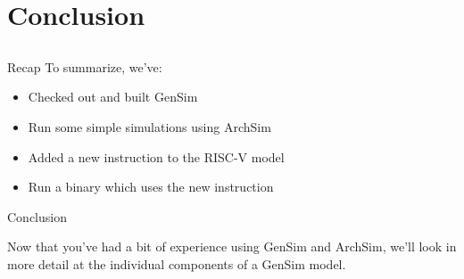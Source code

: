 \section{Conclusion}
\subsection{}

\begin{frame}{Recap}
To summarize, we've:
\begin{itemize}
\item Checked out and built GenSim
\item Run some simple simulations using ArchSim
\item Added a new instruction to the RISC-V model
\item Run a binary which uses the new instruction
\end{itemize}
\end{frame}

\begin{frame}{Conclusion}

Now that you've had a bit of experience using GenSim and ArchSim, we'll
look in more detail at the individual components of a GenSim model.

\end{frame}
